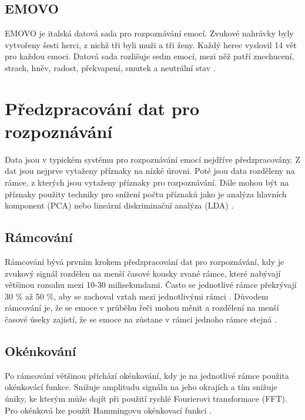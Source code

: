 \documentclass[FM,BP]{tulthesis}
\begin{document}
\subsection{EMOVO} %
EMOVO \cite{DBLP:conf/lrec/CostantiniIPT14} je italská datová sada pro rozpoznávání emocí. Zvukové nahrávky byly vytvořeny šesti herci, z nichž tři byli muži a tři ženy. Každý herec vyslovil 14 vět pro každou emoci. Datová sada rozlišuje sedm emocí, mezi něž patří znechucení, strach, hněv, radost, překvapení, smutek a neutrální stav \cite{COSTANTINI14.591}.

\section{Předzpracování dat pro rozpoznávání}
Data jsou v typickém systému pro rozpoznávání emocí nejdříve předzpracovány. Z dat jsou nejprve vytaženy příznaky na nízké úrovni. Poté jsou data rozděleny na rámce, z kterých jsou vytaženy příznaky pro rozpoznávání. Dále mohou být na příznaky použity techniky pro snížení počtu příznaků jako je analýza hlavních komponent (PCA) nebo lineární diskriminační analýza (LDA) \cite{konar_chakraborty_2015}.

\subsection{Rámcování}
Rámcování bývá prvním krokem předzpracování dat pro rozpoznávání, kdy je zvukový signál rozdělen na menší časové kousky zvané rámce, které nabývají většinou rozsahu mezi 10-30 milisekundami. Často se jednotlivé rámce překrývají 30 \% až 50 \%, aby se zachoval vztah mezi jednotlivými rámci \cite{DBLP:journals/speech/AkcayO20}. Důvodem rámcování je, že se emoce v průběhu řeči mohou měnit a rozdělení na menší časové úseky zajistí, že se emoce na zůstane v rámci jednoho rámce stejná \cite{konar_chakraborty_2015}.

\subsection{Okénkování}
Po rámcování většinou přichází okénkování, kdy je na jednotlivé rámce použita okénkovácí funkce. Snižuje amplitudu signálu na jeho okrajích a tím snižuje úniky, ke kterým může dojít při použití rychlé Fourierovi transformace (FFT). Pro okénková lze použít Hammingovu okénkovací funkci \cite{DBLP:journals/speech/AkcayO20}.
\end{document}
